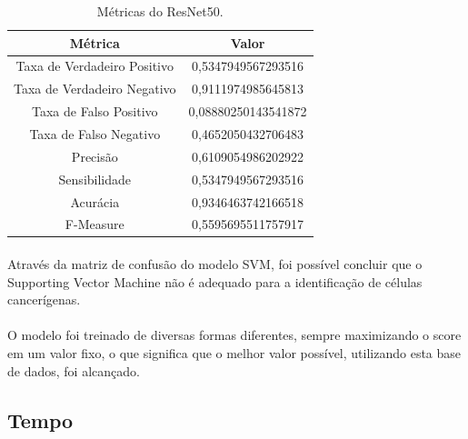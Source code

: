 \documentclass[12pt]{article}
\begin{document}
\begin{table}[]
    \centering
    \begin{tabular}{|c|c|}
        \hline
         Métrica & Valor\\
         \hline
         Taxa de Verdadeiro Positivo & 0,5347949567293516\\
         \hline
         Taxa de Verdadeiro Negativo & 0,9111974985645813\\
         \hline
         Taxa de Falso Positivo & 0,08880250143541872\\
         \hline
         Taxa de Falso Negativo & 0,4652050432706483\\
         \hline
         Precisão & 0,6109054986202922\\
         \hline
         Sensibilidade & 0,5347949567293516\\
         \hline
         Acurácia & 0,9346463742166518\\
         \hline
         F-Measure & 0,5595695511757917\\
         \hline
    \end{tabular}
    \caption{Métricas do ResNet50.}
    \label{tab:metricas-resnet50}
\end{table}

\paragraph{}Através da matriz de confusão do modelo SVM, foi possível concluir que o Supporting Vector Machine não é adequado para a identificação de células cancerígenas.

\paragraph{}O modelo foi treinado de diversas formas diferentes, sempre maximizando o score em um valor fixo, o que significa que o melhor valor possível, utilizando esta base de dados, foi alcançado.

\subsection{Tempo}
\end{document}
